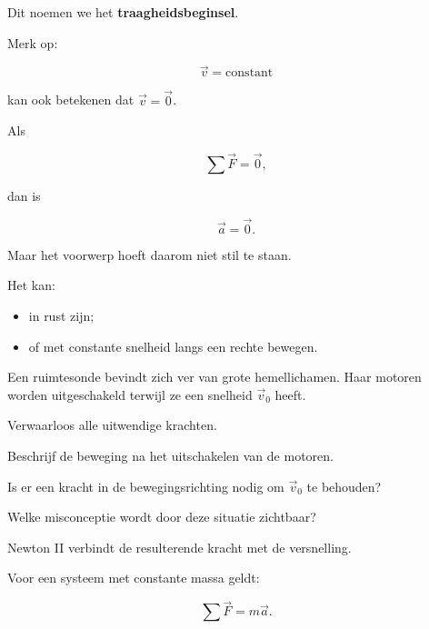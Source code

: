 \documentclass{ximera}
\begin{document}
Dit noemen we het \textbf{traagheidsbeginsel}.

Merk op:

\[
\vec v=\text{constant}
\]

kan ook betekenen dat $\vec v=\vec 0$.



Als

\[
\sum\vec F=\vec 0,
\]

dan is

\[
\vec a=\vec 0.
\]

Maar het voorwerp hoeft daarom niet stil te staan.

Het kan:

\begin{itemize}
  \item in rust zijn;
  \item of met constante snelheid langs een rechte bewegen.
\end{itemize}


\begin{oefening}{\oefU\ESS}

Een ruimtesonde bevindt zich ver van grote hemellichamen. Haar motoren
worden uitgeschakeld terwijl ze een snelheid $\vec v_0$ heeft.

Verwaarloos alle uitwendige krachten.

\begin{question}
Beschrijf de beweging na het uitschakelen van de motoren.
\end{question}

\begin{question}
Is er een kracht in de bewegingsrichting nodig om $\vec v_0$ te
behouden?
\end{question}

\begin{question}
Welke misconceptie wordt door deze situatie zichtbaar?
\end{question}

\end{oefening}




Newton II verbindt de resulterende kracht met de versnelling.

\begin{eigenschap}

Voor een systeem met constante massa geldt:

\[
\boxed{
\sum\vec F=m\vec a.
}
\]

\end{eigenschap}
\end{document}
